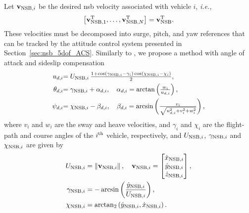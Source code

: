 Let $\mathbf{v}_{{\rm NSB}, i}$ be the desired \gls{nsb} velocity associated with vehicle $i$, \emph{i.e.,}
\begin{equation}
    \left[\mathbf{v}_{{\rm NSB}, 1}^{\mathrm{T}}, \ldots, \mathbf{v}_{{\rm NSB}, N}^{\mathrm{T}}\right] = \mathbf{v}_{\rm NSB}^{\mathrm{T}}.
\end{equation}
These velocities must be decomposed into surge, pitch, and yaw references that can be tracked by the attitude control system presented in Section~\ref{sec:nsb_5dof_ACS}.
Similarly to \cite{arrichiello_formation_2006}, we propose a method with angle of attack and sideslip compensation
\begin{align}
    \scale[0.96]{u_{d, i}} & \scale[0.96]{= U_{{\rm NSB}, i}\,\frac{1 + \cos\left(\gamma_{{\rm NSB}, i} - \gamma_i\right)\cos\left(\chi_{{\rm NSB}, i} - \chi_i\right)}{2},} \label{eq:nsb_5dof_u_d}\\
    \scale[0.96]{\theta_{d, i}} & \scale[0.96]{= \gamma_{{\rm NSB}, i} + \alpha_{d, i}, \quad \alpha_{d, i} = \arctan\left(\frac{w_i}{u_{d, i}}\right),} \label{eq:nsb_5dof_theta_d} \\
    \scale[0.96]{\psi_{d, i}} & \scale[0.96]{= \chi_{{\rm NSB}, i} - \beta_{d, i}, \quad \beta_{d, i} = \arcsin\left(\frac{v_i}{\sqrt{u_{d, i}^2 + v_i^2 + w_i^2}}\right), } \label{eq:nsb_5dof_psi_d}
\end{align}
where $v_i$ and $w_i$ are the sway and heave velocities, and $\gamma_i$ and $\chi_i$ are the flight-path and course angles of the $i^{\rm th}$ vehicle, respectively, and $U_{{\rm NSB},i}$, $\gamma_{{\rm NSB},i}$ and $\chi_{{\rm NSB},i}$ are given by
\begin{subequations}
    \begin{align}
        U_{{\rm NSB}, i} &= \left\|\mathbf{v}_{{\rm NSB}, i}\right\|, \quad
        \mathbf{v}_{{\rm NSB}, i} = \begin{bmatrix} \dot{x}_{{\rm NSB}, i} \\ \dot{y}_{{\rm NSB}, i} \\ \dot{z}_{{\rm NSB}, i}\end{bmatrix}, \\*
        \gamma_{{\rm NSB}, i} &= - \arcsin\left(\frac{\dot{y}_{{\rm NSB}, i}}{U_{{\rm NSB}, i}}\right), \\
        \chi_{{\rm NSB}, i} &= \mathrm{arctan}_2 \left(\dot{y}_{{\rm NSB}, i}, \dot{x}_{{\rm NSB}, i}\right).
    \end{align}
\end{subequations}

